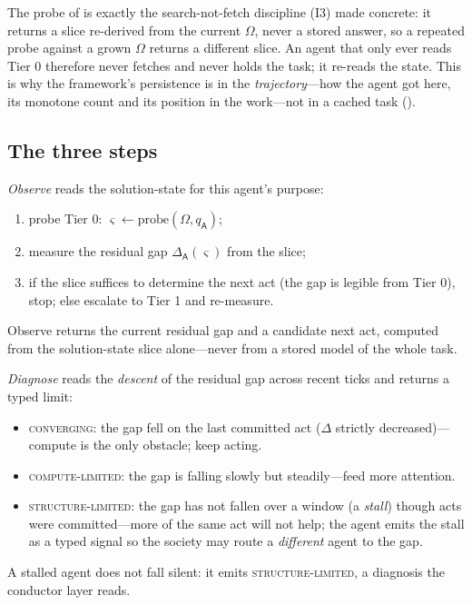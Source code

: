 \documentclass[11pt,twocolumn,a4paper]{article}
\newcommand{\Agent}{\mathsf{A}}
\begin{document}
\begin{remark}
\label{rem:tier0-search}
The probe of  is exactly the search-not-fetch discipline (I3)
made concrete: it returns a slice re-derived from the current $\Omega$, never
a stored answer, so a repeated probe against a grown $\Omega$ returns a
different slice. An agent that only ever reads Tier 0 therefore never fetches
and never holds the task; it re-reads the state. This is why the framework's
persistence is in the \emph{trajectory}---how the agent got here, its monotone
count and its position in the work---not in a cached task
().
\end{remark}

\subsection{The three steps}

\begin{definition}[Observe]
\label{def:step-observe}
\emph{Observe} reads the solution-state for this agent's purpose:
\begin{enumerate}[label=\textup{O\arabic*.},leftmargin=2.6em]
\item probe Tier 0: $\varsigma\gets\mathrm{probe}(\Omega,q_\Agent)$;
\item measure the residual gap $\Delta_\Agent(\varsigma)$ from the slice;
\item if the slice suffices to determine the next act (the gap is legible from
Tier 0), stop; else escalate to Tier 1 and re-measure.
\end{enumerate}
Observe returns the current residual gap and a candidate next act, computed
from the solution-state slice alone---never from a stored model of the whole
task.
\end{definition}

\begin{definition}[Diagnose]
\label{def:step-diagnose}
\emph{Diagnose} reads the \emph{descent} of the residual gap across recent
ticks and returns a typed limit:
\begin{itemize}[leftmargin=*]
\item \textsc{converging}: the gap fell on the last committed act
($\Delta$ strictly decreased)---compute is the only obstacle; keep acting.
\item \textsc{compute-limited}: the gap is falling slowly but steadily---feed
more attention.
\item \textsc{structure-limited}: the gap has not fallen over a window (a
\emph{stall}) though acts were committed---more of the same act will not help;
the agent emits the stall as a typed signal so the society may route a
\emph{different} agent to the gap.
\end{itemize}
A stalled agent does not fall silent: it emits \textsc{structure-limited}, a
diagnosis the conductor layer reads.
\end{definition}
\end{document}
